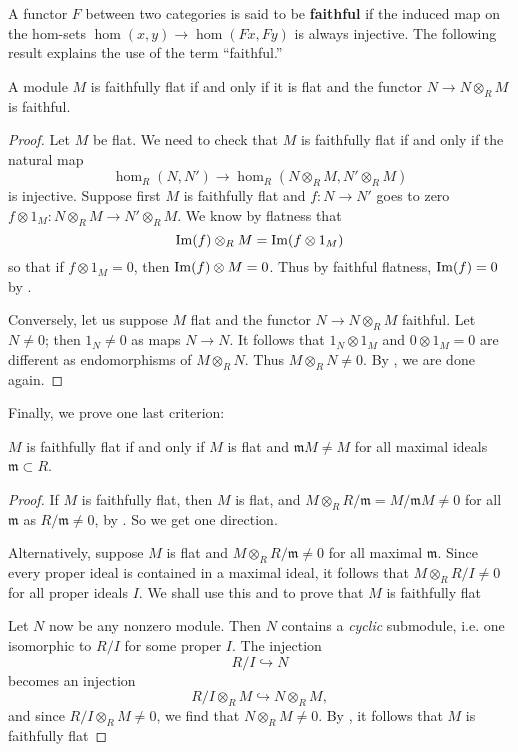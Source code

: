 A functor $F$ between two categories is said to be \textbf{faithful} if the
induced map on the hom-sets $\hom(x,y) \to \hom(Fx, Fy)$ is always injective.
The following result explains the use of the term ``faithful.''

\begin{proposition} 
A module $M$ is faithfully flat if and only if it is flat and the functor $N \to N
\otimes_R M$ is faithful.
\end{proposition} 
\begin{proof} Let $M$ be flat.
We need to check that $M$ is faithfully flat if and only if the natural map
\[ \hom_R(N, N') \to \hom_R(N \otimes_R M, N' \otimes_R M)  \]
is injective.
Suppose first $M$ is faithfully flat and $f: N \to N'$ goes to zero $f \otimes
1_M: N \otimes_R M \to  N' \otimes_R M$. We know by flatness that
\[ \operatorname{Im}(f) \otimes_R M = \operatorname{Im}(f \otimes 1_M)  \]
so that if $f \otimes 1_M = 0$, then $\operatorname{Im}(f) \otimes M = 0$. Thus by faithful
flatness, $\operatorname{Im}(f) = 0$ by .

Conversely, let us suppose $M$ flat and the functor $N \to N \otimes_R M$
faithful. Let $N \neq 0$; then $1_N \neq 0$ as maps $N \to N$. 
It follows that $1_N \otimes 1_M$ and $0 \otimes 1_M = 0$ are different as
endomorphisms of $M \otimes_R N$. Thus $M \otimes_R N \neq 0$. By
, we are done again.
\end{proof} 


Finally, we prove one last criterion:

\begin{proposition} \label{ffmaximal} 
$M$ is faithfully flat if and only if $M$ is flat and $\mathfrak{m}M \neq M$ for all
maximal ideals $\mathfrak{m} \subset R$.
\end{proposition} 
\begin{proof} 
If $M$ is faithfully flat, then $M$ is flat, and $M \otimes_R R/\mathfrak{m} =
M/\mathfrak{m}M \neq 0$ for all $\mathfrak{m}$ as $R/\mathfrak{m} \neq 0$, by
. So we get one direction.

Alternatively, suppose $M$ is flat and $M \otimes_R R/\mathfrak{m} \neq 0$ for
all maximal $\mathfrak{m}$. Since every proper ideal is contained in a maximal
ideal, it follows that $M \otimes_R R/I \neq 0$ for all proper ideals $I$. We
shall use this and  to prove that $M$ is faithfully flat

Let $N$ now be any nonzero module. Then $N$ contains a \emph{cyclic} submodule, i.e.
one isomorphic to $R/I$ for some proper $I$. The injection
\[ R/I \hookrightarrow N  \]
becomes an injection
\[ R/I \otimes_R M \hookrightarrow N \otimes_R M,  \]
and since $R/I \otimes_R M \neq 0$, we find that $N \otimes_R M \neq 0$. By
, it follows that $M$ is faithfully flat
\end{proof} 

